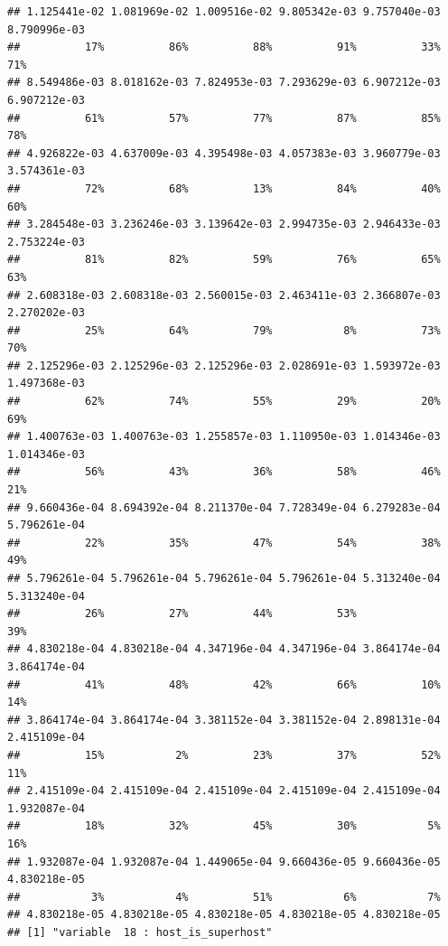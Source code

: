 \begin{verbatim}
## 1.125441e-02 1.081969e-02 1.009516e-02 9.805342e-03 9.757040e-03 8.790996e-03 
##          17%          86%          88%          91%          33%          71% 
## 8.549486e-03 8.018162e-03 7.824953e-03 7.293629e-03 6.907212e-03 6.907212e-03 
##          61%          57%          77%          87%          85%          78% 
## 4.926822e-03 4.637009e-03 4.395498e-03 4.057383e-03 3.960779e-03 3.574361e-03 
##          72%          68%          13%          84%          40%          60% 
## 3.284548e-03 3.236246e-03 3.139642e-03 2.994735e-03 2.946433e-03 2.753224e-03 
##          81%          82%          59%          76%          65%          63% 
## 2.608318e-03 2.608318e-03 2.560015e-03 2.463411e-03 2.366807e-03 2.270202e-03 
##          25%          64%          79%           8%          73%          70% 
## 2.125296e-03 2.125296e-03 2.125296e-03 2.028691e-03 1.593972e-03 1.497368e-03 
##          62%          74%          55%          29%          20%          69% 
## 1.400763e-03 1.400763e-03 1.255857e-03 1.110950e-03 1.014346e-03 1.014346e-03 
##          56%          43%          36%          58%          46%          21% 
## 9.660436e-04 8.694392e-04 8.211370e-04 7.728349e-04 6.279283e-04 5.796261e-04 
##          22%          35%          47%          54%          38%          49% 
## 5.796261e-04 5.796261e-04 5.796261e-04 5.796261e-04 5.313240e-04 5.313240e-04 
##          26%          27%          44%          53%                       39% 
## 4.830218e-04 4.830218e-04 4.347196e-04 4.347196e-04 3.864174e-04 3.864174e-04 
##          41%          48%          42%          66%          10%          14% 
## 3.864174e-04 3.864174e-04 3.381152e-04 3.381152e-04 2.898131e-04 2.415109e-04 
##          15%           2%          23%          37%          52%          11% 
## 2.415109e-04 2.415109e-04 2.415109e-04 2.415109e-04 2.415109e-04 1.932087e-04 
##          18%          32%          45%          30%           5%          16% 
## 1.932087e-04 1.932087e-04 1.449065e-04 9.660436e-05 9.660436e-05 4.830218e-05 
##           3%           4%          51%           6%           7% 
## 4.830218e-05 4.830218e-05 4.830218e-05 4.830218e-05 4.830218e-05 
## [1] "variable  18 : host_is_superhost"
\end{verbatim}

